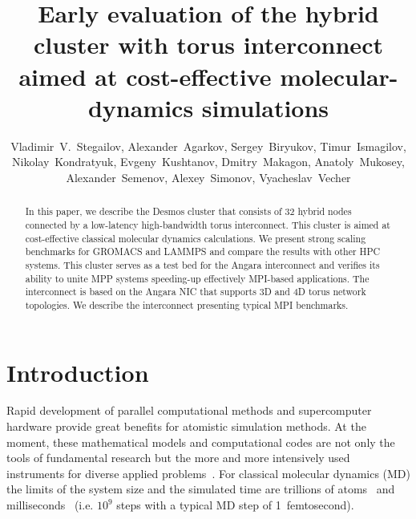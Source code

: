 \documentclass{llncs}
\begin{document}
\title{Early evaluation of the hybrid cluster with torus interconnect aimed at cost-effective molecular-dynamics simulations}

\author{%
Vladimir~V.~Stegailov,
Alexander~Agarkov,
Sergey~Biryukov,
Timur~Ismagilov,
Nikolay~Kondratyuk,
Evgeny~Kushtanov,
Dmitry~Makagon,
Anatoly~Mukosey,
Alexander~Semenov,
Alexey~Simonov,
Vyacheslav~Vecher
}
%
%

\maketitle

\begin{abstract}
In this paper, we describe the Desmos cluster that consists of 32 hybrid nodes connected by a low-latency high-bandwidth torus interconnect. This cluster is aimed at cost-effective classical molecular dynamics calculations. We present strong scaling benchmarks for GROMACS and LAMMPS and compare the results with other HPC systems. This cluster serves as a test bed for the Angara interconnect and verifies its ability to unite MPP systems speeding-up effectively MPI-based applications. The interconnect is based on the Angara NIC that supports 3D and 4D torus network topologies. We describe the interconnect presenting typical MPI benchmarks.  
\end{abstract}


\section{Introduction}

Rapid development of parallel computational methods and supercomputer hardware provide great benefits for atomistic simulation methods. At the moment, these mathematical models and computational codes are not only the tools of fundamental research but the more and more intensively used instruments for diverse applied problems~\cite{Heinecke-etal-MD-Book-2015}. For classical molecular dynamics (MD) the limits of the system size and the simulated time are trillions of atoms~\cite{MD-on-SuperMUC-2013} and milliseconds~\cite{Piana-Klepeis-Shaw-2014} (i.e. $10^9$ steps with a typical MD step of 1~femtosecond).
\end{document}
